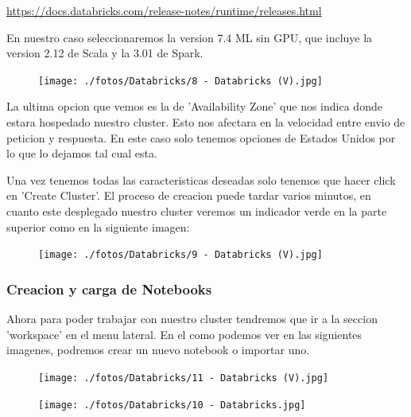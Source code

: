 \documentclass[a4paper,10pt]{article}
\begin{document}
\href{https://docs.databricks.com/release-notes/runtime/releases.html}{https://docs.databricks.com/release-notes/runtime/releases.html}

En nuestro caso seleccionaremos la version 7.4 ML sin GPU, que incluye la version 2.12 de Scala y la 3.01 de Spark. 

\begin{figure}[H]
\begin{center}
\texttt{[image: ./fotos/Databricks/8 - Databricks (V).jpg]}
\end{center}
\end{figure}

La ultima opcion que vemos es la de 'Availability Zone' que nos indica donde estara hospedado nuestro cluster. Esto nos afectara en la velocidad entre envio de peticion y respuesta. En este caso solo tenemos opciones de Estados Unidos por lo que lo dejamos tal cual esta.

Una vez tenemos todas las caracteristicas deseadas solo tenemos que hacer click en 'Create Cluster'. El proceso de creacion puede tardar varios minutos, en cuanto este desplegado nuestro cluster veremos un indicador verde en la parte superior como en la siguiente imagen:

\begin{figure}[H]
\begin{center}
\texttt{[image: ./fotos/Databricks/9 - Databricks (V).jpg]}
\end{center}
\end{figure}

\subsubsection{Creacion y carga de Notebooks}

Ahora para poder trabajar con nuestro cluster tendremos que ir a la seccion 'workspace'  en el menu lateral. En el como podemos ver en las siguientes imagenes, podremos crear un nuevo notebook o importar uno.

\begin{figure}[H]
\begin{center}
\texttt{[image: ./fotos/Databricks/11 - Databricks (V).jpg]}
\end{center}
\end{figure}

\begin{figure}[H]
\begin{center}
\texttt{[image: ./fotos/Databricks/10 - Databricks.jpg]}
\end{center}
\end{figure}
\end{document}
